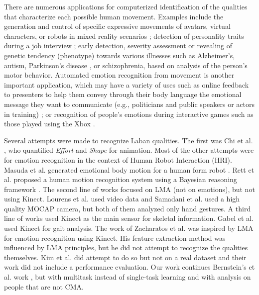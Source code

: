 \documentclass[11pt,twocolumn,varwidth=true,a4paper,fleqn]{sigchi}
\begin{document}
\mbox{}
\par
There are numerous applications for computerized identification of the
qualities that characterize each possible human movement. Examples include the generation and control of specific expressive movements of avatars, virtual characters, or robots in mixed reality scenarios
\cite{Masuda}; detection of personality traits during a job interview
\cite{levy2003use}; early detection, severity assessment or revealing of genetic tendency (phenotype) towards various illnesses such as Alzheimer's,
autism, Parkinson's disease \cite{camurri2003application}, or schizophrenia,
based on analysis of the person's motor behavior. Automated emotion recognition from movement is another
important application, which may have a variety of uses such as online feedback
to presenters to help them convey through their body language the emotional message they want to communicate
(e.g., politicians and public speakers or actors in training) \cite{nguyen2012online}; or recognition
of people's emotions during interactive games such as those played using the Xbox \cite{Zacharatos}.
\mbox{}\\
\par
Several attempts were made to recognize Laban qualities. The first was Chi
et al. \cite{chi2000emote}, who quantified \textit{Effort} and \textit{Shape} for animation.
Most of the other attempts were for emotion recognition in the context of Human Robot Interaction (HRI).
Masuda et al. generated emotional body motion for a human form robot \cite{Masuda}.
Rett et al. proposed a human motion recognition system using a Bayesian reasoning framework \cite{Rett}.
The second line of works focused on LMA (not on emotions), but not using Kinect.
Lourens et al. \cite{lourens2010communicating} used video data and Samadani et al.
\cite{samadani2013laban} used a high quality MOCAP camera, but both of them
analyzed only hand gestures. A third line of works used Kinect as the main
sensor for skeletal information. Gabel et al. \cite{gabel2012full} used Kinect for gait analysis. The work of
Zacharatos et al. \cite{Zacharatos} was inspired by LMA for emotion recognition using Kinect. 
His feature extraction method was influenced by LMA principles, but he did not attempt to 
recognize the qualities themselves. Kim et al. \cite{kim} did attempt to do so but not on 
a real dataset and their work did not include a performance evaluation. Our work
continues Bernstein's et al. work \cite{ran}, but with multitask instead of
single-task learning and with analysis on people that are not CMA.
\end{document}
